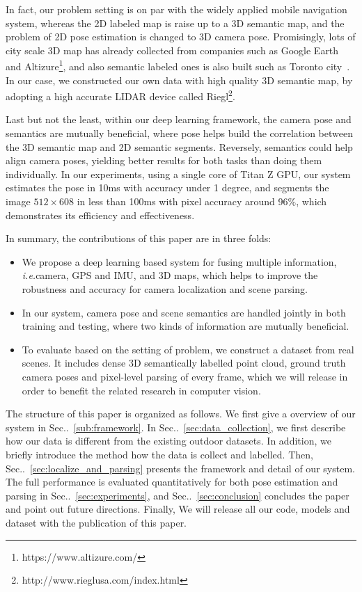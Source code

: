 \documentclass[10pt,twocolumn,letterpaper]{article}
\makeatletter
\newcommand{\secref}[1]{Sec\onedot~\ref{#1}}
\DeclareRobustCommand\onedot{\futurelet\@let@token\@onedot}
\def\onedot{\ifx\@let@token.\else.\null\fi\xspace}
\def\ie{\emph{i.e.}}
\makeatother
\begin{document}
% 
In fact, our problem setting is on par with the widely applied mobile navigation system, whereas the 2D labeled map is raise up to a 3D semantic map, and the problem of 2D pose estimation is changed to 3D camera pose. Promisingly, lots of city scale 3D map has already collected from companies such as Google Earth~\cite{sheppard2009ethics} and Altizure\footnote{https://www.altizure.com/}, and also semantic labeled ones is also built such as Toronto city~\cite{wang2016torontocity}. In our case, we constructed our own data with high quality 3D semantic map, by adopting a high accurate LIDAR device called Riegl\footnote{http://www.rieglusa.com/index.html}.

Last but not the least, within our deep learning framework, the camera pose and semantics are mutually beneficial, where pose helps build the correlation between the 3D semantic map and 2D semantic segments. Reversely, semantics could help align camera poses, yielding better results for both tasks than doing them individually. In our experiments, using a single core of Titan Z GPU, our system estimates the pose in 10ms with accuracy under 1 degree, and segments the image $512 \times 608$ in less than 100ms with pixel accuracy around 96$\%$, which demonstrates its efficiency and effectiveness.

In summary, the contributions of this paper are in three folds:
\begin{itemize}
    \item We propose a deep learning based system for fusing multiple information, \ie camera, GPS and IMU, and 3D maps, which helps to improve the robustness and accuracy for camera localization and scene parsing.
    \item In our system, camera pose and scene semantics are handled jointly in both training and testing, where two kinds of information are mutually beneficial.
    \item To evaluate based on the setting of problem, we construct a dataset from real scenes. It includes dense 3D semantically labelled point cloud, ground truth camera poses and pixel-level parsing of every frame, which we will release in order to benefit the related research in computer vision.
\end{itemize}

The structure of this paper is organized as follows. We first give a overview of our system in \secref{sub:framework}. In \secref{sec:data_collection}, we first describe how our data is different from the existing outdoor datasets. In addition, we briefly introduce the method how the data is collect and labelled. Then, \secref{sec:localize_and_parsing} presents the framework and detail of our system. The full performance is evaluated quantitatively for both pose estimation and parsing in \secref{sec:experiments}, and \secref{sec:conclusion} concludes the paper and point out future directions. Finally, We will release all our code, models and dataset with the publication of this paper.
\end{document}
